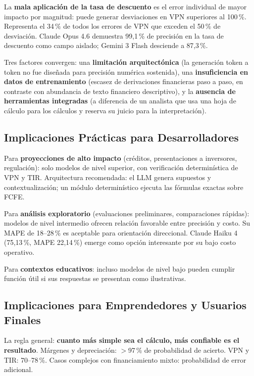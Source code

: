 \documentclass[12pt,a4paper]{article}
\begin{document}
La \textbf{mala aplicación de la tasa de descuento} es el error individual de mayor impacto por magnitud: puede generar desviaciones en VPN superiores al 100\,\%. Representa el 34\,\% de todos los errores de VPN que exceden el 50\,\% de desviación. Claude Opus 4.6 demuestra 99,1\,\% de precisión en la tasa de descuento como campo aislado; Gemini 3 Flash desciende a 87,3\,\%.

Tres factores convergen: una \textbf{limitación arquitectónica} (la generación token a token no fue diseñada para precisión numérica sostenida), una \textbf{insuficiencia en datos de entrenamiento} (escasez de derivaciones financieras paso a paso, en contraste con abundancia de texto financiero descriptivo), y la \textbf{ausencia de herramientas integradas} (a diferencia de un analista que usa una hoja de cálculo para los cálculos y reserva su juicio para la interpretación).

\subsection{Implicaciones Prácticas para Desarrolladores}

Para \textbf{proyecciones de alto impacto} (créditos, presentaciones a inversores, regulación): solo modelos de nivel superior, con verificación determinística de VPN y TIR. Arquitectura recomendada: el LLM genera supuestos y contextualización; un módulo determinístico ejecuta las fórmulas exactas sobre FCFE.

Para \textbf{análisis exploratorio} (evaluaciones preliminares, comparaciones rápidas): modelos de nivel intermedio ofrecen relación favorable entre precisión y costo. Su MAPE de 18--28\,\% es aceptable para orientación direccional. Claude Haiku 4 (75,13\,\%, MAPE 22,14\,\%) emerge como opción interesante por su bajo costo operativo.

Para \textbf{contextos educativos}: incluso modelos de nivel bajo pueden cumplir función útil si sus respuestas se presentan como ilustrativas.

\subsection{Implicaciones para Emprendedores y Usuarios Finales}

La regla general: \textbf{cuanto más simple sea el cálculo, más confiable es el resultado}. Márgenes y depreciación: $>$97\,\% de probabilidad de acierto. VPN y TIR: 70--78\,\%. Casos complejos con financiamiento mixto: probabilidad de error adicional.
\end{document}
